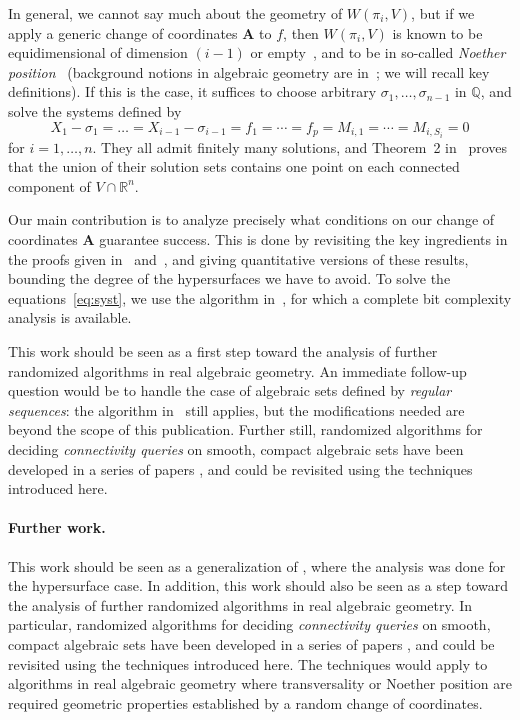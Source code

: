 \documentclass[12pt]{article}
\def\mA{{\bm A}}
\def\Q{\mathbb{Q}}
\def\R{\mathbb{R}}
\begin{document}
In general, we cannot say much about the geometry of $W(\pi_i,V)$, but
if we apply a generic change of coordinates $\mA$ to $f$, then
$W(\pi_i,V)$ is known to be equidimensional of dimension $(i-1)$ or
empty~\cite{BaGiHeMb97}, and to be in so-called {\em Noether
  position}~\cite{EMP} (background notions in algebraic geometry are
in~\cite{Mumford76,Shafarevich77,ECA}; we will recall key
definitions). If this is the case, it suffices to choose arbitrary
$\sigma_1,\dots,\sigma_{n-1}$ in $\Q$, and solve the systems defined
by
\begin{equation}\label{eq:syst1}
  X_1-\sigma_1 = \dots = X_{i-1}-\sigma_{i-1} = f_1 = \cdots = f_p = M_{i,1} = \cdots = M_{i,S_i} = 0
\end{equation}
for $i=1,\dots,n$.  They all admit finitely many solutions, and
Theorem~2 in~\cite{EMP} proves that the union of their solution sets
contains one point on each connected component of $V \cap \R^n$.

Our main contribution is to analyze precisely what conditions on our
change of coordinates $\mA$ guarantee success. This is done by
revisiting the key ingredients in the proofs given
in~\cite{BaGiHeMb97} and~\cite{EMP}, and giving quantitative versions
of these results, bounding the degree of the hypersurfaces we have to
avoid.  To solve the equations~\eqref{eq:syst}, we use the algorithm
in~\cite{SH}, for which a complete bit complexity analysis is
available.

This work should be seen as a first step toward the analysis of
further randomized algorithms in real algebraic geometry. An immediate
follow-up question would be to handle the case of algebraic sets
defined by {\em regular sequences}: the algorithm in~\cite{EMP} still
applies, but the modifications needed are beyond the scope of this
publication. Further still, randomized algorithms for deciding {\em
  connectivity queries} on smooth, compact algebraic sets have been
developed in a series of papers
\cite{SchostMohabBabySteps2011,SchostMohabBabySteps2014}, and could be
revisited using the techniques introduced here.


\paragraph*{Further work.}
This work should be seen as a generalization of \cite{ElGiSh20}, where
the analysis was done for the hypersurface case. In addition, this
work should also be seen as a step toward the analysis of further
randomized algorithms in real algebraic geometry.  In particular,
randomized algorithms for deciding {\em connectivity queries} on
smooth, compact algebraic sets have been developed in a series of
papers \cite{SchostMohabBabySteps2011,SchostMohabBabySteps2014}, and
could be revisited using the techniques introduced here. The
techniques would apply to algorithms in real algebraic geometry where
transversality or Noether position are required geometric properties
established by a random change of coordinates.
\end{document}
